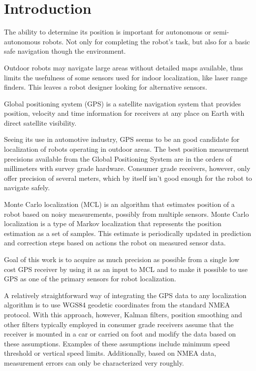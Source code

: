 \chapter{Introduction}


The ability to determine its position is important for autonomous or semi-autonomous robots.
Not only for completing the robot's task, but also for a basic
safe navigation though the environment.

Outdoor robots may navigate large areas without detailed maps available, thus limits
the usefulness of some sensors used for indoor localization, like laser range finders.
This leaves a robot designer looking for alternative sensors.

Global positioning system (GPS) is a satellite navigation system that
provides position, velocity and time information for receivers at any place on Earth with direct
satellite visibility.

Seeing its use in automotive industry, GPS seems to be an good candidate for
localization of robots operating in outdoor areas.
The best position measurement precisions available from the Global Positioning System
are in the orders of millimeters with survey grade hardware.
Consumer grade receivers, however, only offer precision of several meters, which
by itself isn't good enough for the robot to navigate safely.


Monte Carlo localization (MCL) is an algorithm that estimates position of a robot
based on noisy measurements, possibly from multiple sensors.
Monte Carlo localization is a type of Markov localization that represents the position estimation as
a set of samples.
This estimate is periodically updated in prediction and correction steps based on
actions the robot on measured sensor data.


\vspace{1.5em}

Goal of this work is to acquire as much precision as possible from a single low cost
GPS receiver by using it as an input to MCL and to make it possible to use
GPS as one of the primary sensors for robot localization.

A relatively straightforward way of integrating the GPS data to any localization algorithm is
to use WGS84 geodetic coordinates from the standard NMEA protocol.
With this approach, however, Kalman filters, position smoothing and other filters typically
employed in  consumer grade receivers assume that the receiver is mounted in a car or carried on foot
and modify the data based on these assumptions.
Examples of these assumptions include minimum speed threshold or vertical speed limits.
Additionally, based on NMEA data, measurement errors can only be characterized very roughly.

